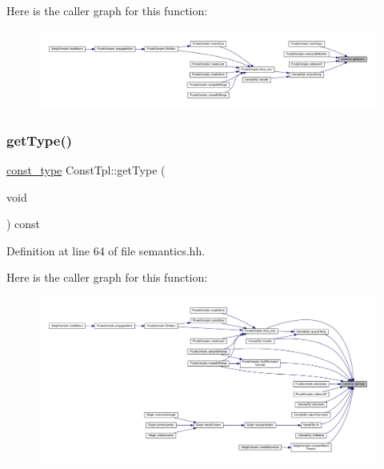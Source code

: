 Here is the caller graph for this function\+:
\nopagebreak
\begin{figure}[H]
\begin{center}
\leavevmode
\includegraphics[width=350pt]{class_const_tpl_ab23dfe352075812889649cffec63f80a_icgraph}
\end{center}
\end{figure}
\mbox{\label{class_const_tpl_ac919975d2d1ceff56bc5a0e6961ec04b}} 
\subsubsection{\texorpdfstring{getType()}{getType()}}
{\footnotesize\ttfamily \mbox{\hyperlink{class_const_tpl_af7f677ee5ef2e5af1becb0109793396b}{const\+\_\+type}} Const\+Tpl\+::get\+Type (\begin{DoxyParamCaption}\item[{void}]{ }\end{DoxyParamCaption}) const\hspace{0.3cm}{\ttfamily [inline]}}



Definition at line 64 of file semantics.\+hh.

Here is the caller graph for this function\+:
\nopagebreak
\begin{figure}[H]
\begin{center}
\leavevmode
\includegraphics[width=350pt]{class_const_tpl_ac919975d2d1ceff56bc5a0e6961ec04b_icgraph}
\end{center}
\end{figure}
\mbox{\label{class_const_tpl_a9b303a814a4e17013e37d4dcb70b4a79}} 
